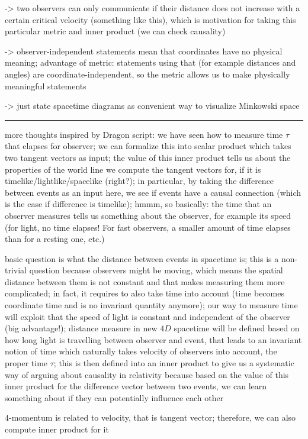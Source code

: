 -> two observers can only communicate if their distance does not increase with a certain critical velocity (something like this), which is motivation for taking this particular metric and inner product (we can check causality)

-> observer-independent statements mean that coordinates have no physical meaning; advantage of metric: statements using that (for example distances and angles) are coordinate-independent, so the metric allows us to make physically meaningful statements

-> just state spacetime diagrams as convenient way to visualize Minkowski space

\hrule

more thoughts inspired by Dragon script: we have seen how to measure time $\tau$ that elapses for observer; we can formalize this into scalar product which takes two tangent vectors as input; the value of this inner product tells us about the properties of the world line we compute the tangent vectors for, if it is timelike/lightlike/spacelike (right?); in particular, by taking the difference between events as an input here, we see if events have a causal connection (which is the case if difference is timelike); hmmm, so basically: the time that an observer measures tells us something about the observer, for example its speed (for light, no time elapses! For fast observers, a smaller amount of time elapses than for a resting one, etc.)

basic question is what the distance between events in spacetime is; this is a non-trivial question because observers might be moving, which means the spatial distance between them is not constant and that makes measuring them more complicated; in fact, it requires to also take time into account (time becomes coordinate time and is no invariant quantity anymore); our way to measure time will exploit that the speed of light is constant and independent of the observer (big advantage!); distance measure in new $4D$ spacetime will be defined based on how long light is travelling between observer and event, that leads to an invariant notion of time which naturally takes velocity of observers into account, the proper time $\tau$; this is then defined into an inner product to give us a systematic way of arguing about causality in relativity because based on the value of this inner product for the difference vector between two events, we can learn something about if they can potentially influence each other


$4$-momentum is related to velocity, that is tangent vector; therefore, we can also compute inner product for it



